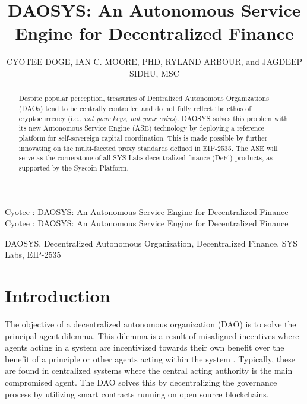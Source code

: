 \documentclass[journal,twocolumn,12pt]{ieeesyscoin}
\begin{document}
\linenumbers
\history{}

\title{\centering DAOSYS: An Autonomous Service Engine for Decentralized Finance}
\author{\centering  \uppercase{Cyotee Doge}, 
\uppercase{Ian C. Moore, PhD},
\uppercase{Ryland Arbour}, and
\uppercase{Jagdeep Sidhu, MSc}}

\address[1]{\centering DAO Advisor, Syscoin Platform (e-mail: cyotee@syscoin.org)}
\address[2]{\centering  Syscoin Researcher, Syscoin Platform (e-mail: imoore@syscoin.org)}
\address[3]{\centering  L2 Advisor, Syscoin Platform (e-mail: rylandarbour@syscoin.com)}
\address[4]{\centering Syscoin Lead Developer, (e-mail: sidhujag@syscoin.org)}
\tfootnote{}

\markboth
{Cyotee \headeretal: DAOSYS: An Autonomous Service Engine for Decentralized Finance}
{Cyotee \headeretal: DAOSYS: An Autonomous Service Engine for Decentralized Finance}

\corresp{}

\begin{abstract}
Despite popular perception, treasuries of Dentralized Autonomous Organizations (DAOs) tend to be centrally controlled and do not fully reflect the ethos of cryptocurrency (i.e., \textit{not your keys, not your coins}). DAOSYS solves this problem with its new Autonomous Service Engine (ASE) technology by deploying a reference platform for self-sovereign capital coordination. This is made possible by further innovating on the multi-faceted proxy standards defined in EIP-2535. The ASE will serve as the cornerstone of all SYS Labs decentralized finance (DeFi) products, as supported by the Syscoin Platform.
\end{abstract}

\begin{keywords}
DAOSYS, Decentralized Autonomous Organization, Decentralized Finance, SYS Labs, EIP-2535
\end{keywords}

\titlepgskip=-15pt

\maketitle

\section{Introduction}
\label{sec:introduction}

The objective of a decentralized autonomous organization (DAO) is to solve the principal-agent dilemma. This dilemma is a result of misaligned incentives where agents acting in a system are incentivized towards their own benefit over the benefit of a principle or other agents acting within the system \cite{San83}. Typically, these are found in centralized systems where the central acting authority is the main compromised agent. The DAO solves this by decentralizing the governance process by utilizing smart contracts running on open source blockchains.
\end{document}
